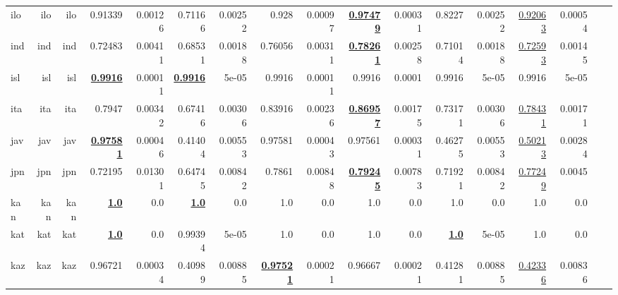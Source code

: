 \documentclass[11pt]{article}
\begin{document}
\begin{table*}[h]
{\begin{tabular}{lrrrrrrrrrrrrrrrr}
ilo         & ilo         & ilo         & 0.91339         & 0.00126         & 0.71166         & 0.00252         & 0.928         & 0.00097         & \textbf{\underline{0.97479}}         & 0.00031         & 0.8227         & 0.00252         & \underline{0.92063}         & 0.00054         \\
ind         & ind         & ind         & 0.72483         & 0.00411         & 0.68531         & 0.00188         & 0.76056         & 0.00311         & \textbf{\underline{0.78261}}         & 0.00258         & 0.71014         & 0.00188         & \underline{0.72593}         & 0.00145         \\
isl         & isl         & isl         & \textbf{\underline{0.9916}}         & 0.00011         & \textbf{\underline{0.9916}}         & 5e-05         & 0.9916         & 0.00011         & 0.9916         & 0.0001         & 0.9916         & 5e-05         & 0.9916         & 5e-05         \\
ita         & ita         & ita         & 0.7947         & 0.00342         & 0.67416         & 0.00306         & 0.83916         & 0.00236         & \textbf{\underline{0.86957}}         & 0.00175         & 0.73171         & 0.00306         & \underline{0.78431}         & 0.00171         \\
jav         & jav         & jav         & \textbf{\underline{0.97581}}         & 0.00046         & 0.41404         & 0.00553         & 0.97581         & 0.00043         & 0.97561         & 0.00031         & 0.46275         & 0.00553         & \underline{0.50213}         & 0.00284         \\
jpn         & jpn         & jpn         & 0.72195         & 0.01301         & 0.64745         & 0.00842         & 0.7861         & 0.00848         & \textbf{\underline{0.79245}}         & 0.00783         & 0.71921         & 0.00842         & \underline{0.77249}         & 0.0045         \\
kan         & kan         & kan         & \textbf{\underline{1.0}}         & 0.0         & \textbf{\underline{1.0}}         & 0.0         & 1.0         & 0.0         & 1.0         & 0.0         & 1.0         & 0.0         & 1.0         & 0.0         \\
kat         & kat         & kat         & \textbf{\underline{1.0}}         & 0.0         & 0.99394         & 5e-05         & 1.0         & 0.0         & 1.0         & 0.0         & \textbf{\underline{1.0}}         & 5e-05         & 1.0         & 0.0         \\
kaz         & kaz         & kaz         & 0.96721         & 0.00034         & 0.40989         & 0.00885         & \textbf{\underline{0.97521}}         & 0.00021         & 0.96667         & 0.00021         & 0.41281         & 0.00885         & \underline{0.42336}         & 0.00836         \\

\end{tabular}}
\end{table*}
\end{document}

